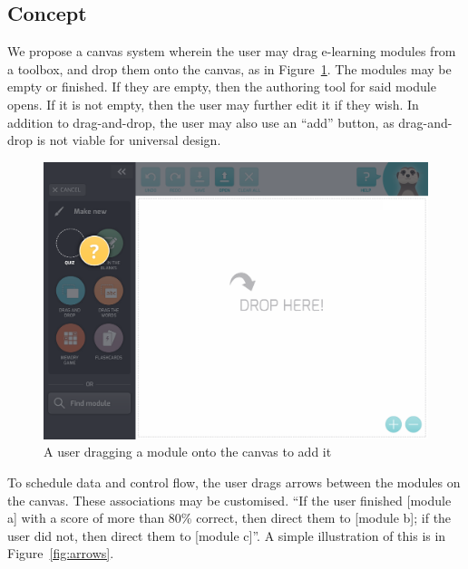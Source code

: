 \subsection{Concept }
We propose a canvas system wherein the user may drag e-learning modules from a 
toolbox, and drop them onto the canvas, as in Figure~\ref{fig:adding}. The 
modules may be empty or finished. If they are empty, then the authoring tool 
for said module opens. If it is not empty, then the user may further edit it 
if they wish. In addition to drag-and-drop, the user may also use an ``add'' 
button, as drag-and-drop is not viable for universal design.

\begin{figure}[H]
    \centering
    \begin{scale}{0.1}
        \includegraphics{fig/adding.png}
    \end{scale}
    \caption{A user dragging a module onto the canvas to add it}
   \label{fig:adding}
\end{figure}

To schedule data and control flow, the user drags arrows between the modules 
on the canvas. These associations may be customised. ``If the user finished 
[module a] with a score of more than 80\% correct, then direct them to [module 
b]; if the user did not, then direct them to [module c]''. A simple 
illustration of this is in Figure~\ref{fig:arrows}.

